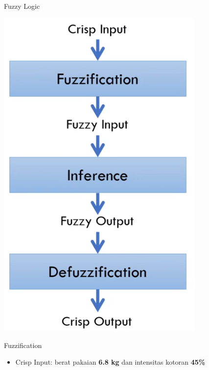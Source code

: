 \documentclass[pdflatex,compress,mathserif]{beamer}
\begin{document}
\begin{frame}{Fuzzy Logic}
	\begin{center}
		\includegraphics[height=0.8\textheight]{img/22}
	\end{center}
\end{frame}

\begin{frame}{Fuzzification}
	\begin{itemize}
		\item Crisp Input: berat pakaian \textbf{6.8 kg} dan intensitas kotoran \textbf{45\%}
	\end{itemize}
\end{frame}
\end{document}
